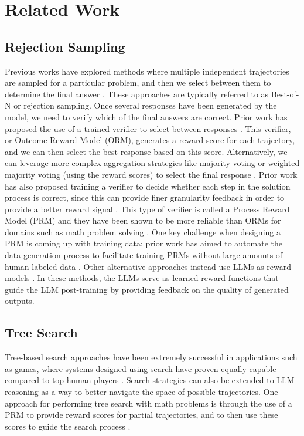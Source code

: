 \section{Related Work}

\subsection{Rejection Sampling}
Previous works have explored methods where multiple independent trajectories are sampled for a particular problem, and then we select between them to determine the final answer \cite{wang2022self, chen2024more,beeching2024scalingtesttimecompute, brown2024large}.
These approaches are typically referred to as Best-of-N or rejection sampling. 
Once several responses have been generated by the model, we need to verify which of the final answers are correct.  
Prior work has proposed the use of a trained verifier to select between responses \cite{cobbe2021training}.
This verifier, or Outcome Reward Model (ORM), generates a reward score for each trajectory, and we can then select the best response based on this score.
Alternatively, we can leverage more complex aggregation strategies like majority voting or weighted majority voting (using the reward scores) to select the final response \cite{wang2022self, chen2024more,beeching2024scalingtesttimecompute}.
Prior work has also proposed training a verifier to decide whether each step in the solution process is correct, since this can provide finer granularity feedback in order to provide a better reward signal \cite{uesato2022solving}. 
This type of verifier is called a Process Reward Model (PRM) and they have been shown to be more reliable than ORMs for domains such as math problem solving \cite{lightman2023let}.
One key challenge when designing a PRM is coming up with training data; prior work has aimed to automate the data generation process to facilitate training PRMs without large amounts of human labeled data \cite{wang2024math}.
Other alternative approaches instead use LLMs as reward models \cite{bai2022constitutional,abdulhai2023lmrl,lee2024rlaif,pan2024autonomous}. In these methods, the LLMs serve as learned reward functions that guide the LLM post-training by providing feedback on the quality of generated outputs.

\subsection{Tree Search}

Tree-based search approaches have been extremely successful in applications such as games, where systems designed using search have proven equally capable compared to top human players \cite{brown2017libratus, silver2016mastering, silver2017mastering}.
Search strategies can also be extended to LLM reasoning as a way to better navigate the space of possible trajectories.
One approach for performing tree search with math problems is through the use of a PRM to  provide reward scores for partial trajectories, and to then use these scores to guide the search process \cite{yao2024tree,zhou2023language,besta2024graph, snell2024scaling}.


